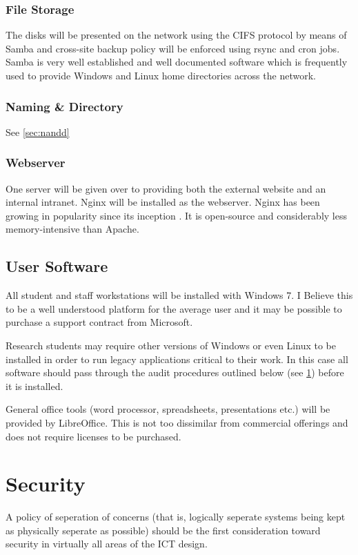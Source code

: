 \documentclass[a4paper, twoside]{article}
\begin{document}
\subsubsection{File Storage}
The disks will be presented on the network using the CIFS protocol by means of
Samba and cross-site backup policy will be enforced using rsync and cron jobs.
Samba is very well established and well documented software which is frequently
used to provide Windows and Linux home directories across the network.

\subsubsection{Naming \& Directory}
See \ref{sec:nandd}

\subsubsection{Webserver}
One server will be given over to providing both the external website and an
internal intranet. Nginx will be installed as the webserver. Nginx has been
growing in popularity since its inception \cite{nginx}. It is open-source and
considerably less memory-intensive than Apache.

\subsection{User Software}
All student and staff workstations will be installed with Windows 7. I Believe
this to be a well understood platform for the average user and it may be
possible to purchase a support contract from Microsoft.

Research students may require other versions of Windows or even Linux to be
installed in order to run legacy applications critical to their work. In this
case all software should pass through the audit procedures outlined below (see
\ref{sec:security}) before it is installed.

General office tools (word processor, spreadsheets, presentations etc.) will be
provided by LibreOffice. This is not too dissimilar from commercial offerings
and does not require licenses to be purchased.

\section{Security}
\label{sec:security}
A policy of seperation of concerns (that is, logically seperate systems being
kept as physically seperate as possible) should be the first consideration
toward security in virtually all areas of the ICT design.
\end{document}
